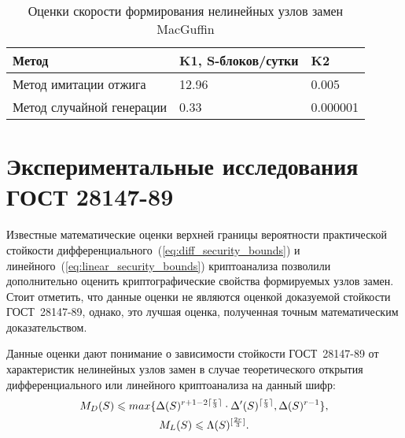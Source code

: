 \begin{table}
    \caption{Оценки скорости формирования нелинейных узлов замен MacGuffin}
    \label{table:speedtest_MacGuffin_annealing}
    \begin{tabular}{| m{7.7cm} | m{4cm} | m{4cm} |}
        \hline
        Метод                       & K1, \newline S-блоков/сутки   & K2        \\ \hline
        Метод имитации отжига       & 12.96                         & 0.005     \\ \hline
        Метод случайной генерации   & 0.33                          & 0.000001  \\ \hline
    \end{tabular}
\end{table}

\section{Экспериментальные исследования ГОСТ 28147-89}

Известные математические оценки верхней границы вероятности практической
стойкости \cite{Alekseychuk} дифференциального~(\ref{eq:diff_security_bounds}) и
линейного~(\ref{eq:linear_security_bounds}) криптоанализа позволили
дополнительно оценить криптографические свойства формируемых узлов замен. Стоит
отметить, что данные оценки не являются оценкой доказуемой стойкости
ГОСТ~28147-89, однако, это лучшая оценка, полученная точным математическим
доказательством.

Данные оценки дают понимание о зависимости стойкости ГОСТ~28147-89 от
характеристик нелинейных узлов замен в случае теоретического открытия
дифференциального или линейного криптоанализа на данный шифр:
\begin{gather}
M_D(S) \leqslant max\{\Delta(S)^{r+1-2\lceil\frac{r}{3}\rceil} \cdot \Delta'(S)^{\lceil\frac{r}{3}\rceil}, \Delta(S)^{r-1}\},\\
M_L(S) \leqslant \Lambda(S)^{[\frac{2r}{3}]}.
\end{gather}

